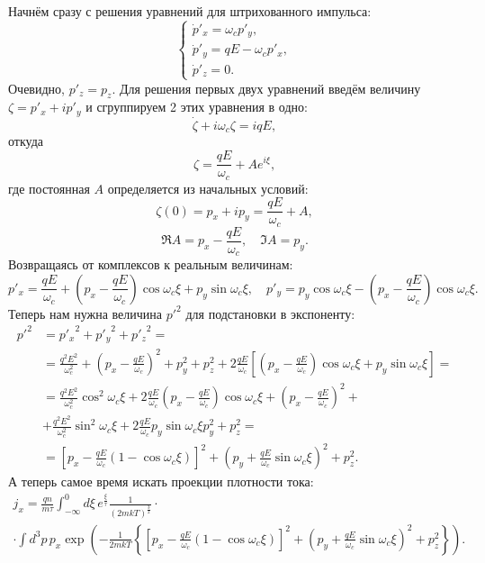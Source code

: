 Начнём сразу с решения уравнений для штрихованного импульса:
\[
    \left\{
    \begin{array}{l}
        \dot{p}'_x = \omega_c p'_y, \\
        \dot{p}'_y = qE - \omega_c p'_x, \\
        \dot{p}'_z = 0.
    \end{array}
    \right.
\]
Очевидно, \( p'_z = p_z \). Для решения первых двух уравнений введём величину
\( \zeta = p'_x + ip'_y \) и сгруппируем 2 этих уравнения в одно:
\[
    \dot{\zeta} + i\omega_c\zeta = iqE,
\]
откуда
\[
    \zeta = \frac{qE}{\omega_c} + Ae^{i\xi},
\]
где постоянная \( A \) определяется из начальных условий:
\[
    \zeta(0) = p_x + ip_y = \frac{qE}{\omega_c} + A,
\]
\[
    \Re A = p_x - \frac{qE}{\omega_c},\quad
    \Im A = p_y.
\]
Возвращаясь от комплексов к реальным величинам:
\[
    p'_x = \frac{qE}{\omega_c} +
        \left(p_x - \frac{qE}{\omega_c}\right)\cos\omega_c\xi +
        p_y\sin\omega_c\xi,\quad
    p'_y = p_y\cos\omega_c\xi -
        \left(p_x - \frac{qE}{\omega_c}\right)\cos\omega_c\xi.
\]
Теперь нам нужна величина \( p'^2 \) для подстановки в экспоненту:
\begin{align*}
    p'^2 & = {p'_x}^2 + {p'_y}^2 + {p'_z}^2 =\\
         & = \frac{q^2E^2}{\omega_c^2} +
        \left(p_x - \frac{qE}{\omega_c}\right)^2 + p_y^2 + p_z^2 +
        2\frac{qE}{\omega_c}\left[
            \left(p_x - \frac{qE}{\omega_c}\right)\cos\omega_c\xi +
            p_y\sin\omega_c\xi
        \right]=\\
        & = \frac{q^2E^2}{\omega_c^2}\cos^2\omega_c\xi
        + 2\frac{qE}{\omega_c}\left(p_x - \frac{qE}{\omega_c}\right)
        \cos\omega_c\xi +
        \left(p_x - \frac{qE}{\omega_c}\right)^2 +\\
        & + \frac{q^2E^2}{\omega_c^2}\sin^2\omega_c\xi
        + 2\frac{qE}{\omega_c}p_y\sin\omega_c\xi
        p_y^2 + p_z^2 =\\
        & = \left[p_x - \frac{qE}{\omega_c}(1-\cos\omega_c\xi)\right]^2 +
        \left(p_y + \frac{qE}{\omega_c}\sin\omega_c\xi\right)^2 + p_z^2.
\end{align*}
А теперь самое время искать проекции плотности тока:
\begin{gather*}
    j_x = \frac{qn}{m\tau} \int_{-\infty}^0 d\xi\, e^\frac{\xi}{\tau}
    \frac{1}{(2mkT)^\frac{3}{2}} \cdot \\
    \cdot \int d^3p\, p_x
    \exp\left(-\frac{1}{2mkT}\left\{
        \left[p_x - \frac{qE}{\omega_c}(1-\cos\omega_c\xi)\right]^2 +
        \left(p_y + \frac{qE}{\omega_c}\sin\omega_c\xi\right)^2 + p_z^2
    \right\}\right).
\end{gather*}
